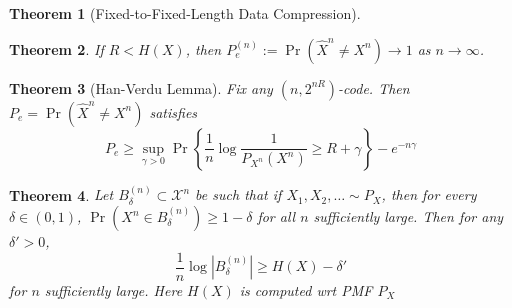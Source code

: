 \documentclass[frenchspacing,9pt,landscape,a4paper]{article}
\newcommand{\abs}[1]{\left\lvert #1 \right\rvert}
\DeclareMathOperator{\pr}{Pr}
\newtheorem*{thm}{Theorem}
\begin{document}
\begin{multicols}{4}
\begin{thm}[Fixed-to-Fixed-Length Data Compression]
\end{thm}
\begin{thm}
    If $R<H(X)$, then  $P_e^{(n)}:=\pr(\hat{X}^n\neq X^n)\to 1$ as  $n\to\infty$.
\end{thm}
\begin{thm}[Han-Verdu Lemma]
    Fix any $(n,2^{nR})$-code. Then  $P_e=\pr(\hat{X}^n\neq X^n)$ satisfies
    \[P_e\geq\sup_{\gamma>0}\pr\left\{\frac{1}{n}\log \frac{1}{P_{X^n}(X^n)}\geq
    R+\gamma\right\}-e^{-n\gamma}\]
\end{thm}
\begin{thm}
    Let $B_\delta^{(n)}\subset\mathcal{X}^n$ be such that if  $X_1,X_2,\dots\sim P_X$, then for every
    $\delta\in(0,1)$,  $\pr(X^n\in B_\delta^{(n)})\geq 1-\delta$ for all  $n$ sufficiently large. Then for
    any $\delta'>0$,
    \[\frac{1}{n}\log\abs{B_\delta^{(n)}}\geq H(X)-\delta'\] for $n$ sufficiently large. Here  $H(X)$ is
    computed wrt PMF  $P_X$
\end{thm}

\end{multicols}
\end{document}
